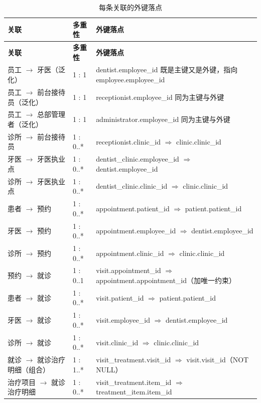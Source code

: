 \documentclass[11pt,a4paper]{ctexart}
\begin{document}
{\small
\begin{longtable}{@{}L{4.4cm}L{1.7cm}L{9.2cm}@{}}
\caption{每条关联的外键落点}\\
\toprule
\textbf{\textcolor{adcblue!92}{关联}} & \textbf{\textcolor{adcblue!92}{多重性}} & \textbf{\textcolor{adcblue!92}{外键落点}} \\
\midrule
\endfirsthead
\toprule
\textbf{\textcolor{adcblue!92}{关联}} & \textbf{\textcolor{adcblue!92}{多重性}} & \textbf{\textcolor{adcblue!92}{外键落点}} \\
\midrule
\endhead
\bottomrule
\endlastfoot
员工 $\rightarrow$ 牙医（泛化） & 1 : 1 & dentist.employee\_id 既是主键又是外键，指向 employee.employee\_id \\
员工 $\rightarrow$ 前台接待员（泛化） & 1 : 1 & receptionist.employee\_id 同为主键与外键 \\
员工 $\rightarrow$ 总部管理者（泛化） & 1 : 1 & administrator.employee\_id 同为主键与外键 \\
诊所 $\rightarrow$ 前台接待员 & 1 : 0..* & receptionist.clinic\_id $\Rightarrow$ clinic.clinic\_id \\
牙医 $\rightarrow$ 牙医执业点 & 1 : 0..* & dentist\_clinic.employee\_id $\Rightarrow$ dentist.employee\_id \\
诊所 $\rightarrow$ 牙医执业点 & 1 : 0..* & dentist\_clinic.clinic\_id $\Rightarrow$ clinic.clinic\_id \\
患者 $\rightarrow$ 预约 & 1 : 0..* & appointment.patient\_id $\Rightarrow$ patient.patient\_id \\
牙医 $\rightarrow$ 预约 & 1 : 0..* & appointment.employee\_id $\Rightarrow$ dentist.employee\_id \\
诊所 $\rightarrow$ 预约 & 1 : 0..* & appointment.clinic\_id $\Rightarrow$ clinic.clinic\_id \\
预约 $\rightarrow$ 就诊 & 1 : 0..1 & visit.appointment\_id $\Rightarrow$ appointment.appointment\_id（加唯一约束） \\
患者 $\rightarrow$ 就诊 & 1 : 0..* & visit.patient\_id $\Rightarrow$ patient.patient\_id \\
牙医 $\rightarrow$ 就诊 & 1 : 0..* & visit.employee\_id $\Rightarrow$ dentist.employee\_id \\
诊所 $\rightarrow$ 就诊 & 1 : 0..* & visit.clinic\_id $\Rightarrow$ clinic.clinic\_id \\
就诊 $\rightarrow$ 就诊治疗明细（组合） & 1 : 1..* & visit\_treatment.visit\_id $\Rightarrow$ visit.visit\_id（NOT NULL） \\
治疗项目 $\rightarrow$ 就诊治疗明细 & 1 : 0..* & visit\_treatment.item\_id $\Rightarrow$ treatment\_item.item\_id \\

\end{longtable}}
\end{document}
